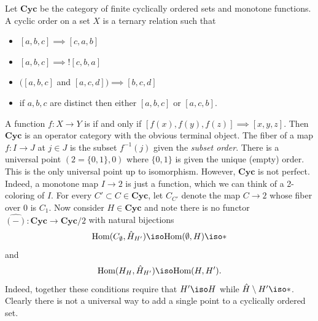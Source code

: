 \begin{example}
Let $\mathbf{Cyc}$ be the category of finite cyclically ordered sets and monotone functions. A cyclic order on a set $X$ is a ternary relation such that
\begin{itemize}
    \item $[a,b,c]\implies [c,a,b]$
    \item $[a,b,c]\implies ![c,b,a]$
    \item $\big([a,b,c]$ and $[a,c,d]\big)\implies [b,c,d]$
    \item if $a,b,c$ are distinct then either $[a,b,c]$ or $[a,c,b]$.
\end{itemize}
A function $f:X\rightarrow Y$ is  if and only if $[f(x),f(y),f(z)]\implies [x,y,z]$. Then $\mathbf{Cyc}$ is an operator category with the obvious terminal object. The fiber of a map $f:I\rightarrow J$ at $j\in J$ is the subset $f^{-1}(j)$ given the \textit{subset order}. There is a universal point $(2=\{0,1\},0)$ where $\{0,1\}$ is given the unique (empty) order. This is the only universal point up to isomorphism. However, $\mathbf{Cyc}$ is not perfect. Indeed, a monotone map $I\rightarrow 2$ is just a function, which we can think of a 2-coloring of $I.$ For every $C'\subset C\in \mathbf{Cyc}$, let $C_{C'}$ denote the map $C\rightarrow 2$ whose fiber over $0$ is $C_1$. Now consider $H\in\mathbf{Cyc}$ and note there is no functor $\hat{(-)}:\mathbf{Cyc}\rightarrow \mathbf{Cyc}/2$ with natural bijections $$\text{Hom}(C_{\emptyset},\hat{H}_{H'})\iso \text{Hom}(\emptyset,H)\iso *$$ and
$$\text{Hom}(H_H,\hat{H}_{H'})\iso \text{Hom}(H,H').$$
Indeed, together these conditions require that $H'\iso H$ while $\hat{H}\setminus H' \iso *$. Clearly there is not a universal way to add a single point to a cyclically ordered set.
\end{example}
